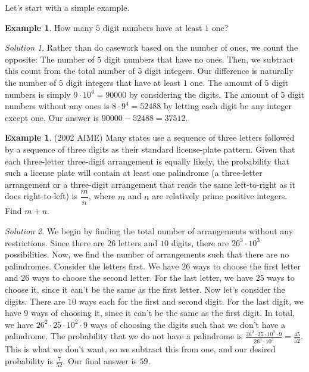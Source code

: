 \documentclass[l1pt]{article}
\theoremstyle{plain}
\theoremstyle{definition}
\newtheorem{example}[thm]{Example}
\theoremstyle{remark}
\newtheorem*{solution}{Solution}
\begin{document}
Let's start with a simple example.

\begin{example}
How many $5$ digit numbers have at least $1$ one?
\end{example}

\begin{solution}
Rather than do casework based on the number of ones, we count the opposite: The number of $5$ digit numbers that have no ones. Then, we subtract this count from the total number of $5$ digit integers. Our difference is naturally the number of $5$ digit integers that have at least $1$ one. The amount of $5$ digit numbers is simply $9\cdot 10^4=90000$ by considering the digits. The amount of $5$ digit numbers without any ones is $8\cdot 9^4=52488$ by letting each digit be any integer except one. Our answer is $90000-52488=37512$.
\end{solution}



\begin{example}
(2002 AIME) Many states use a sequence of three letters followed by a sequence of three digits as their standard license-plate pattern. Given that each three-letter three-digit arrangement is equally likely, the probability that such a license plate will contain at least one palindrome (a three-letter arrangement or a three-digit arrangement that reads the same left-to-right as it does right-to-left) is $\dfrac{m}{n}$, where $m$ and $n$ are relatively prime positive integers. Find $m+n.$
\end{example}

\begin{solution}
We begin by finding the total number of arrangements without any restrictions. Since there are $26$ letters and $10$ digits, there are $26^3\cdot 10^3$ possibilities. Now, we find the number of arrangements such that there are no palindromes. Consider the letters first. We have $26$ ways to choose the first letter and $26$ ways to choose the second letter. For the last letter, we have $25$ ways to choose it, since it can't be the same as the first letter. Now let's consider the digits. There are $10$ ways each for the first and second digit. For the last digit, we have $9$ ways of choosing it, since it can't be the same as the first digit. In total, we have $26^2\cdot 25 \cdot 10^2 \cdot 9$ ways of choosing the digits such that we don't have a palindrome. The probability that we do not have a palindrome is $\frac{26^2\cdot 25\cdot 10^2 \cdot 9}{26^3\cdot 10^3}=\frac{45}{52}$. This is what we don't want, so we subtract this from one, and our desired probability is $\frac{7}{52}$. Our final answer is $59$.
\end{solution}
\end{document}
